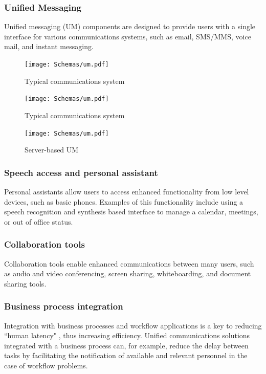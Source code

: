 \subsubsection{Unified Messaging}
Unified messaging (UM) components are designed to provide users with a single interface for various communications systems, such as email, SMS/MMS, voice mail, and instant messaging\cite{banner_understanding_2010}.
\begin{figure}[h!]
	\centering
	\texttt{[image: Schemas/um.pdf]}
	\caption[Typical communications system]{Typical communications system}
	\label{fig:um_typical}
\end{figure}

\begin{figure}[h!]
	\centering
	\texttt{[image: Schemas/um.pdf]}
	\caption[Client-based UM]{Typical communications system}
	\label{fig:um_client}
\end{figure}

\begin{figure}[h!]
	\centering
	\texttt{[image: Schemas/um.pdf]}
	\caption{Server-based UM}
	\label{fig:um_server}
\end{figure}

\clearpage

\subsubsection{Speech access and personal assistant}
Personal assistants allow users to access enhanced functionality from low level devices, such as basic phones. Examples of this functionality include using a speech recognition and synthesis based interface to manage a calendar, meetings, or out of office status\cite{pleasant_what_2008}.


\subsubsection{Collaboration tools}
Collaboration tools enable enhanced communications between many users, such as audio and video conferencing, screen sharing, whiteboarding, and document sharing tools\cite{riemer_unified_2009}.

\subsubsection{Business process integration}
Integration with business processes and workflow applications is a key to reducing ``human latency" , thus increasing efficiency. Unified communications solutions integrated with a business process can, for example, reduce the delay between tasks by facilitating the notification of available and relevant personnel in the case of workflow problems\cite{pleasant_what_2008}.

